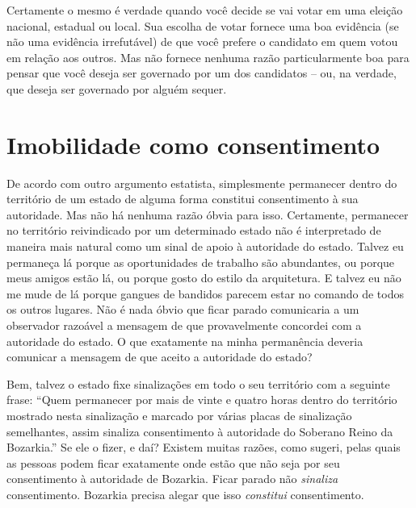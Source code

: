 Certamente o mesmo é verdade quando você decide se vai votar em uma eleição nacional, estadual ou local. Sua escolha de votar fornece uma boa evidência (se não uma evidência irrefutável) de que você prefere o candidato em quem votou em relação aos outros. Mas não fornece nenhuma razão particularmente boa para pensar que você deseja ser governado por um dos candidatos -- ou, na verdade, que deseja ser governado por alguém sequer.

\section{Imobilidade como consentimento}

De acordo com outro argumento estatista, simplesmente permanecer dentro do território de um estado de alguma forma constitui consentimento à sua autoridade. Mas não há nenhuma razão óbvia para isso. Certamente, permanecer no território reivindicado por um determinado estado não é interpretado de maneira mais natural como um sinal de apoio à autoridade do estado. Talvez eu permaneça lá porque as oportunidades de trabalho são abundantes, ou porque meus amigos estão lá, ou porque gosto do estilo da arquitetura. E talvez eu não me mude de lá porque gangues de bandidos parecem estar no comando de todos os outros lugares. Não é nada óbvio que ficar parado comunicaria a um observador razoável a mensagem de que provavelmente concordei com a autoridade do estado. O que exatamente na minha permanência deveria comunicar a mensagem de que aceito a autoridade do estado?

Bem, talvez o estado fixe sinalizações em todo o seu território com a seguinte frase: ``Quem permanecer por mais de vinte e quatro horas dentro do território mostrado nesta sinalização e marcado por várias placas de sinalização semelhantes, assim sinaliza consentimento à autoridade do Soberano Reino da Bozarkia.'' Se ele o fizer, e daí? Existem muitas razões, como sugeri, pelas quais as pessoas podem ficar exatamente onde estão que não seja por seu consentimento à autoridade de Bozarkia. Ficar parado não \emph{sinaliza} consentimento. Bozarkia precisa alegar que isso \emph{constitui} consentimento.

